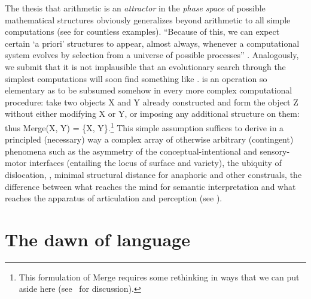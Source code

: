 \documentclass[output=paper]{langsci/langscibook}
\begin{document}
The thesis that arithmetic is an \emph{attractor} in the \emph{phase}
\emph{space} of possible mathematical structures obviously generalizes beyond
arithmetic to all simple computations (see \citealt{Wolfram2002} for countless
examples). “Because of this, we can expect certain `a priori’
structures to appear, almost always, whenever a computational system evolves by
selection from a universe of possible processes” \citep[119]{Minsky1985}.
Analogously, we submit that it is not implausible that an evolutionary search
through the simplest computations will soon find something like .  is
an operation so elementary as to be subsumed somehow in every more complex
computational procedure: take two objects X and Y already constructed and form
the object Z without either modifying X or Y, or imposing any additional
structure on them: thus Merge(X, Y) = \{X, Y\}.\footnote{This formulation of
Merge requires some rethinking in ways that we can put aside here
(see~\citealt{Chomskyfc} for discussion).} This simple assumption suffices to derive in a
principled (necessary) way a complex array of otherwise arbitrary (contingent)
phenomena such as the asymmetry of the conceptual-intentional and sensory-motor
interfaces (entailing the locus of surface  and variety), the
ubiquity of dislocation, , minimal structural distance for
anaphoric and other construals, the difference between what reaches the mind
for semantic interpretation and what reaches the apparatus of articulation and
perception (see \citealt{Chomsky2017}).

\section{The dawn of language}
\end{document}
